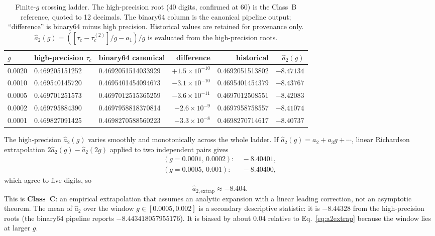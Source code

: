 \documentclass[10pt,twocolumn]{article}
\theoremstyle{definition}
\newcommand{\tauc}{\tau_c^{(2)}}
\begin{document}
\begin{table}[t]
\centering\small
\caption{Finite-$g$ crossing ladder. The high-precision root (40 digits, confirmed at 60) is the Class~B reference, quoted to 12 decimals. The binary64 column is the canonical pipeline output; ``difference'' is binary64 minus high precision. Historical values are retained for provenance only. $\hat a_2(g)=([\tau_c-\tauc]/g-a_1)/g$ is evaluated from the high-precision roots.}
\label{tab:ladder}
\begin{tabular}{@{}lllrrr@{}}
\toprule
$g$&high-precision $\tau_c$&binary64 canonical&difference&historical&$\hat a_2(g)$\\\midrule
0.0020&0.469205151252&0.4692051514033929&$+1.5\times10^{-10}$&0.4692051513802&$-8.47134$\\
0.0010&0.469540145720&0.4695401454094673&$-3.1\times10^{-10}$&0.4695401454379&$-8.43767$\\
0.0005&0.469701251573&0.4697012515365259&$-3.6\times10^{-11}$&0.4697012508551&$-8.42083$\\
0.0002&0.469795884390&0.4697958818370814&$-2.6\times10^{-9}$&0.4697958758557&$-8.41074$\\
0.0001&0.469827091425&0.4698270588560223&$-3.3\times10^{-8}$&0.4698270714617&$-8.40737$\\\bottomrule
\end{tabular}
\end{table}

The high-precision $\hat a_2(g)$ varies smoothly and monotonically across the whole ladder. If $\hat a_2(g)=a_2+a_3g+\cdots$, linear Richardson extrapolation $2\hat a_2(g)-\hat a_2(2g)$ applied to two independent pairs gives
\begin{align}
(g=0.0001,\,0.0002):&\ -8.40401,\nonumber\\
(g=0.0005,\,0.001):&\ -8.40400,\nonumber
\end{align}
which agree to five digits, so
\begin{equation}
\hat a_{2,\mathrm{extrap}}\approx-8.404 .\label{eq:a2extrap}
\end{equation}
This is \textbf{Class~C}: an empirical extrapolation that assumes an analytic expansion with a linear leading correction, not an asymptotic theorem. The mean of $\hat a_2$ over the window $g\in[0.0005,0.002]$ is a secondary descriptive statistic: it is $-8.44328$ from the high-precision roots (the binary64 pipeline reports $-8.443418057955176$). It is biased by about $0.04$ relative to Eq.~\eqref{eq:a2extrap} because the window lies at larger $g$.
\end{document}
